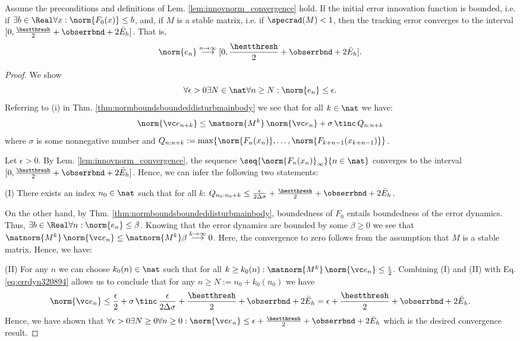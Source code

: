 \begin{thm}
Assume the preconditions and definitions of Lem. \ref{lem:innovnorm_convergence} hold.
If the initial error innovation function is bounded, i.e. if $\exists b \in \Real \forall x: \norm{F_0(x)} \leq b $, and, if $M$ is a stable matrix, i.e. if $\specrad(M) <1$, then the tracking error converges to the interval $[0,\frac \hestthresh 2 +  \obserrbnd + 2 \bar E_h]$. That is,
\[\norm{e_n} \stackrel{n \to \infty}{\longrightarrow} [0,\frac \hestthresh 2 +  \obserrbnd + 2 \bar E_h]. \]

\end{thm}
\begin{proof}
We show 
\begin{equation}
\forall \epsilon > 0 \exists N \in \nat \forall n\geq N: \norm{e_n} \leq \epsilon.
\end{equation}
Referring to (i) in Thm. \ref{thm:normboundsboundeddisturbmainbody} we see that for all $k \in \nat$ we have: 
\begin{equation}
\norm{\vc e_{n+k}} \leq \matnorm{M^{k}} \, \norm{\vc e_n} + \sigma \, \tinc \, Q_{n:n+k} 
\label{eq:errdyn320894}
\end{equation}
where $\sigma$ is some nonnegative number and $Q_{n:n+k}:=\max\{\norm{F_n(x_n)},\ldots,\norm{F_{k+n-1}(x_{k+n-1})} \}$.


Let $\epsilon >0$. By Lem. \ref{lem:innovnorm_convergence}, the sequence $\seq{\norm{F_n(x_n)}_\infty}{n \in \nat}$ converges to the interval $[0, \frac \hestthresh 2 +  \obserrbnd +2\bar E_h]$. Hence, we can infer the following two statements:


(I) There exists an index $n_0 \in \nat$ such that for all $k$: $Q_{n_0:n_0+k} \leq \frac{\epsilon}{2 \Delta \sigma}+\frac \hestthresh 2 +  \obserrbnd +2\bar E_h$.

On the other hand,
by Thm. \ref{thm:normboundsboundeddisturbmainbody}, boundedness of $F_0$ entails boundedness of the error dynamics. Thus, $\exists b \in \Real \forall n: \norm{e_n} \leq \beta$.
Knowing that the error dynamics are bounded by some $\beta \geq 0$ we see that $\matnorm{M^{k}} \, \norm{\vc e_n} \leq \matnorm{M^{k}} \beta \stackrel{k \to \infty}{\longrightarrow} 0$. Here, the convergence to zero follows from the assumption that $M$ is a stable matrix. Hence,
we have:

(II) For any $n$ we can choose $k_0(n) \in \nat$ such that for all $k \geq k_0(n): \matnorm{M^{k}} \, \norm{\vc e_n} \leq \frac\epsilon 2 $.
%
Combining (I) and (II) with Eq. \ref{eq:errdyn320894} allows us to conclude that for any $n \geq N:= n_0 +k_0(n_0)$  we have 
\begin{equation*}
\norm{\vc e_{n}} \leq \frac \epsilon 2 + \sigma \, \tinc \,\frac{\epsilon}{2 \Delta \sigma} +\frac \hestthresh 2 +  \obserrbnd +2\bar E_h= \epsilon +\frac \hestthresh 2 +  \obserrbnd +2\bar E_h. 
\label{eq:errdyn3208942}
\end{equation*}
Hence, we have shown that $\forall \epsilon >0 \exists N \geq 0 \forall n\geq 0: \norm{\vc e_{n}} \leq \epsilon +\frac \hestthresh 2 +  \obserrbnd +2\bar E_h$ which is the desired convergence result.

\end{proof}
